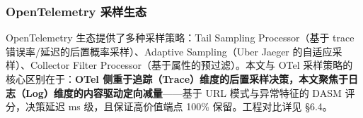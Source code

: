 \vspace{0.3em}

\subsubsection{OpenTelemetry 采样生态}
\label{sec:otel-sampling}
OpenTelemetry 生态提供了多种采样策略：Tail Sampling Processor（基于 trace 错误率/延迟的后置概率采样）、Adaptive Sampling（Uber Jaeger 的自适应采样）、Collector Filter Processor（基于属性的预过滤）。本文与 OTel 采样策略的核心区别在于：\textbf{OTel 侧重于追踪（Trace）维度的后置采样决策，本文聚焦于日志（Log）维度的内容驱动定向减量}——基于 URL 模式与异常特征的 DASM 评分，决策延迟 ms 级，且保证高价值端点 100\% 保留。工程对比详见 §6.4。
